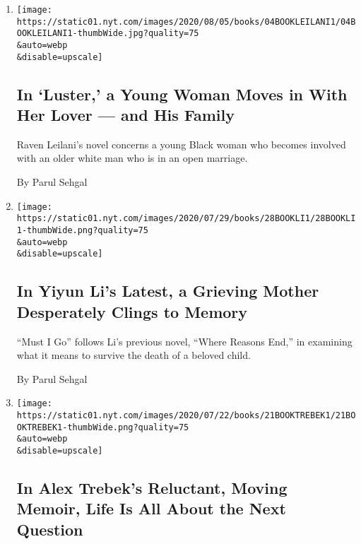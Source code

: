 \begin{enumerate}
\def\labelenumi{\arabic{enumi}.}
\item
  \href{/2020/08/04/books/review-luster-raven-leilani.html}{}

  \texttt{[image: https://static01.nyt.com/images/2020/08/05/books/04BOOKLEILANI1/04BOOKLEILANI1-thumbWide.jpg?quality=75\\\&auto=webp\\\&disable=upscale]}

  \hypertarget{in-luster-a-young-woman-moves-in-with-her-lover--and-his-family}{%
  \subsection{In `Luster,' a Young Woman Moves in With Her Lover --- and
  His
  Family}\label{in-luster-a-young-woman-moves-in-with-her-lover--and-his-family}}

  Raven Leilani's novel concerns a young Black woman who becomes
  involved with an older white man who is in an open marriage.

  By Parul Sehgal
\item
  \href{/2020/07/28/books/review-must-i-go-yiyun-li.html}{}

  \texttt{[image: https://static01.nyt.com/images/2020/07/29/books/28BOOKLI1/28BOOKLI1-thumbWide.png?quality=75\\\&auto=webp\\\&disable=upscale]}

  \hypertarget{in-yiyun-lis-latest-a-grieving-mother-desperately-clings-to-memory}{%
  \subsection{In Yiyun Li's Latest, a Grieving Mother Desperately Clings
  to
  Memory}\label{in-yiyun-lis-latest-a-grieving-mother-desperately-clings-to-memory}}

  ``Must I Go'' follows Li's previous novel, ``Where Reasons End,'' in
  examining what it means to survive the death of a beloved child.

  By Parul Sehgal
\item
  \href{/2020/07/21/books/review-answer-is-alex-trebek-jeopardy-memoir.html}{}

  \texttt{[image: https://static01.nyt.com/images/2020/07/22/books/21BOOKTREBEK1/21BOOKTREBEK1-thumbWide.png?quality=75\\\&auto=webp\\\&disable=upscale]}

  \hypertarget{in-alex-trebeks-reluctant-moving-memoir-life-is-all-about-the-next-question}{%
  \subsection{In Alex Trebek's Reluctant, Moving Memoir, Life Is All
  About the Next
  Question}\label{in-alex-trebeks-reluctant-moving-memoir-life-is-all-about-the-next-question}}


\end{enumerate}
